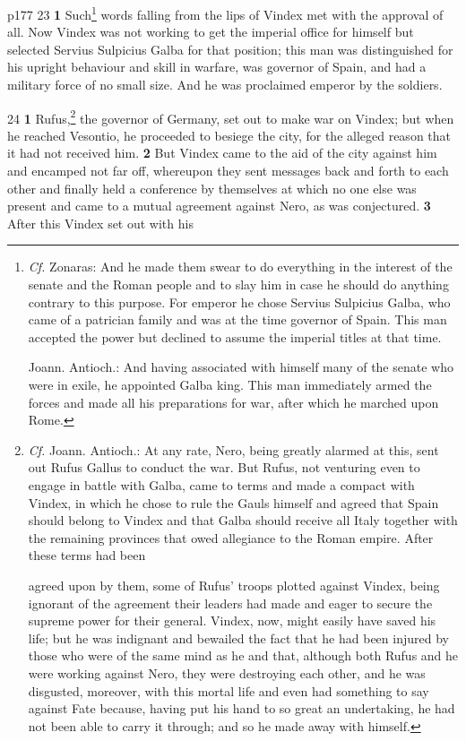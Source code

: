 p177
23
\textbf{1} Such\texthebrew{⁠}\footnote{\emph{Cf.} Zonaras: And he made them swear to do everything in the interest of the senate and the Roman people and to slay him in case he should do anything contrary to this purpose. For emperor he chose Servius Sulpicius Galba, who came of a patrician family and was at the time governor of Spain. This man accepted the power but declined to assume the imperial titles at that time.

Joann. Antioch.: And having associated with himself many of the senate who were in exile, he appointed Galba king. This man immediately armed the forces and made all his preparations for war, after which he marched upon Rome.

} words falling from the lips of Vindex met with the approval of all. Now Vindex was not working to get the imperial office for himself but selected Servius Sulpicius Galba for that position; this man was distinguished for his upright behaviour and skill in warfare, was governor of Spain, and had a military force of no small size. And he was proclaimed emperor by the soldiers.

24
\textbf{1} Rufus,\texthebrew{⁠}\footnote{\emph{Cf.} Joann. Antioch.: At any rate, Nero, being greatly alarmed at this, sent out Rufus Gallus to conduct the war. But Rufus, not venturing even to engage in battle with Galba, came to terms and made a compact with Vindex, in which he chose to rule the Gauls himself and agreed that Spain should belong to Vindex and that Galba should receive all Italy together with the remaining provinces that owed allegiance to the Roman empire. After these terms had been

agreed upon by them, some of Rufus' troops plotted against Vindex, being ignorant of the agreement their leaders had made and eager to secure the supreme power for their general. Vindex, now, might easily have saved his life; but he was indignant and bewailed the fact that he had been injured by those who were of the same mind as he and that, although both Rufus and he were working against Nero, they were destroying each other, and he was disgusted, moreover, with this mortal life and even had something to say against Fate because, having put his hand to so great an undertaking, he had not been able to carry it through; and so he made away with himself.

} the governor of Germany, set out to make war on Vindex; but when he reached Vesontio, he proceeded to besiege the city, for the alleged reason that it had not received him. \textbf{2} But Vindex came to the aid of the city against him and encamped not far off, whereupon they sent messages back and forth to each other and finally held a conference by themselves at which no one else was present and came to a mutual agreement against Nero, as was conjectured. \textbf{3} After this Vindex set out with his

